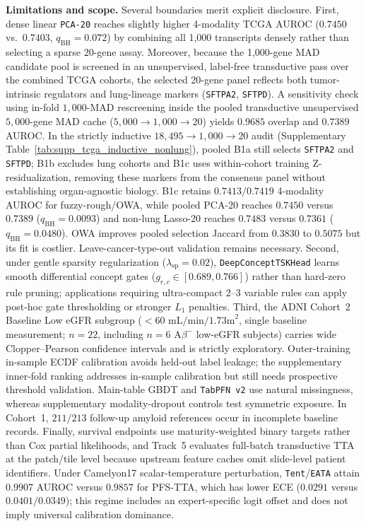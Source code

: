 \documentclass[10pt,twocolumn]{article}
\begin{document}
\noindent\textbf{Limitations and scope.}
Several boundaries merit explicit disclosure. First, dense linear \texttt{PCA-20} reaches
slightly higher 4-modality TCGA AUROC ($0.7450$ vs.\ $0.7403$, $q_{\text{BH}}=0.072$) by
combining all 1,000 transcripts densely rather than selecting a sparse 20-gene assay. Moreover,
because the 1,000-gene MAD candidate pool is screened in an unsupervised, label-free
transductive pass over the combined TCGA cohorts, the selected 20-gene panel reflects both
tumor-intrinsic regulators and lung-lineage markers (\texttt{SFTPA2}, \texttt{SFTPD}). A
sensitivity check using in-fold $1,000$-MAD rescreening inside the pooled
transductive unsupervised $5,000$-gene MAD cache ($5,000 \to 1,000 \to 20$) yields $0.9685$
overlap and $0.7389$ AUROC. In the strictly inductive $18,495\to1,000\to20$ audit
(Supplementary Table~\ref{tab:supp_tcga_inductive_nonlung}), pooled B1a still selects
\texttt{SFTPA2} and
\texttt{SFTPD}; B1b excludes lung cohorts and B1c uses within-cohort training
Z-residualization, removing these markers from the consensus panel without establishing
organ-agnostic biology. B1c retains $0.7413/0.7419$ 4-modality AUROC for fuzzy-rough/OWA,
while pooled PCA-20 reaches $0.7450$ versus $0.7389$ ($q_{\mathrm{BH}}=0.0093$) and non-lung
Lasso-20 reaches $0.7483$ versus $0.7361$ ($q_{\mathrm{BH}}=0.0480$). OWA improves pooled
selection Jaccard from $0.3830$ to $0.5075$ but its fit is costlier. Leave-cancer-type-out
validation remains necessary. Second, under gentle sparsity regularization
($\lambda_{\text{sp}}=0.02$),
\texttt{DeepConceptTSKHead} learns smooth differential concept gates ($g_{r,c} \in [0.689,
0.766]$) rather than hard-zero rule pruning; applications requiring ultra-compact 2--3 variable
rules can apply post-hoc gate thresholding or stronger $L_1$ penalties. Third, the ADNI
Cohort~2 Baseline Low eGFR subgroup ($<60\text{ mL/min/1.73m}^2$, single baseline
measurement; $n=22$, including $n=6$ A$\beta^-$ low-eGFR subjects) carries wide
Clopper--Pearson confidence intervals and is strictly exploratory. Outer-training in-sample
ECDF calibration avoids held-out label leakage; the supplementary inner-fold ranking addresses
in-sample calibration but still needs prospective threshold validation. Main-table GBDT and
\texttt{TabPFN~v2} use natural missingness, whereas supplementary modality-dropout controls
test symmetric exposure. In Cohort~1, $211/213$ follow-up amyloid references occur in
incomplete baseline records. Finally, survival endpoints
use maturity-weighted binary targets rather than Cox partial likelihoods, and Track~5 evaluates
full-batch transductive TTA at the patch/tile level because upstream feature caches omit
slide-level patient identifiers. Under Camelyon17 scalar-temperature perturbation,
\texttt{Tent}/\texttt{EATA} attain $0.9907$ AUROC versus $0.9857$ for PFS-TTA, which has
lower ECE ($0.0291$ versus $0.0401/0.0349$); this regime includes an expert-specific logit
offset and does not imply universal calibration dominance.
\end{document}
